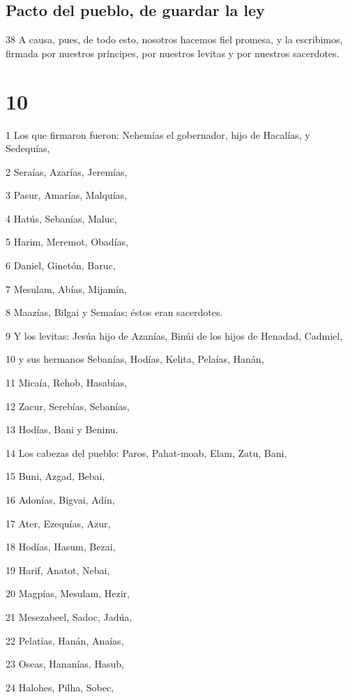 \section*{Pacto del pueblo, de guardar la ley}

\par 38 A causa, pues, de todo esto, nosotros hacemos fiel promesa, y la escribimos, firmada por nuestros príncipes, por nuestros levitas y por nuestros sacerdotes.

\chapter{10}

\par 1 Los que firmaron fueron: Nehemías el gobernador, hijo de Hacalías, y Sedequías,
\par 2 Seraías, Azarías, Jeremías,
\par 3 Pasur, Amarías, Malquías,
\par 4 Hatús, Sebanías, Maluc,
\par 5 Harim, Meremot, Obadías,
\par 6 Daniel, Ginetón, Baruc,
\par 7 Mesulam, Abías, Mijamín,
\par 8 Maazías, Bilgai y Semaías; éstos eran sacerdotes.
\par 9 Y los levitas: Jesúa hijo de Azanías, Binúi de los hijos de Henadad, Cadmiel,
\par 10 y sus hermanos Sebanías, Hodías, Kelita, Pelaías, Hanán,
\par 11 Micaía, Rehob, Hasabías,
\par 12 Zacur, Serebías, Sebanías,
\par 13 Hodías, Bani y Beninu.
\par 14 Los cabezas del pueblo: Paros, Pahat-moab, Elam, Zatu, Bani,
\par 15 Buni, Azgad, Bebai,
\par 16 Adonías, Bigvai, Adín,
\par 17 Ater, Ezequías, Azur,
\par 18 Hodías, Hasum, Bezai,
\par 19 Harif, Anatot, Nebai,
\par 20 Magpías, Mesulam, Hezir,
\par 21 Mesezabeel, Sadoc, Jadúa,
\par 22 Pelatías, Hanán, Anaías,
\par 23 Oseas, Hananías, Hasub,
\par 24 Halohes, Pilha, Sobec,
